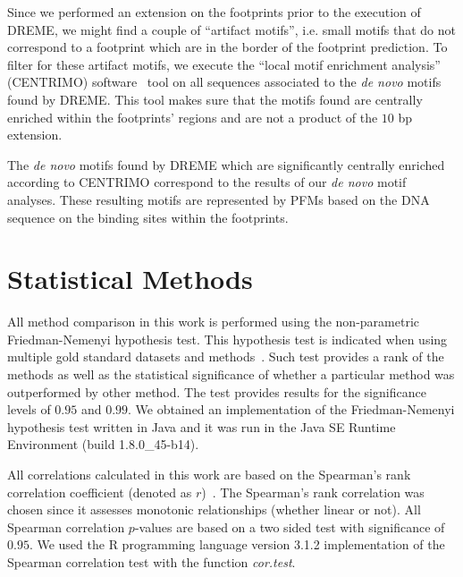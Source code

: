 Since we performed an extension on the footprints prior to the execution of DREME, we might find a couple of ``artifact motifs'', i.e. small motifs that do not correspond to a footprint which are in the border of the footprint prediction. To filter for these artifact motifs, we execute the ``local motif enrichment analysis'' (CENTRIMO) software~\citep{bailey2012} tool on all sequences associated to the \emph{de novo} motifs found by DREME. This tool makes sure that the motifs found are centrally enriched within the footprints' regions and are not a product of the $10$ bp extension.

The \emph{de novo} motifs found by DREME which are significantly centrally enriched according to CENTRIMO correspond to the results of our \emph{de novo} motif analyses. These resulting motifs are represented by PFMs based on the DNA sequence on the binding sites within the footprints.

\section{Statistical Methods}
\label{sec:further.statistical.methods}

All method comparison in this work is performed using the non-parametric Friedman-Nemenyi hypothesis test. This hypothesis test is indicated when using multiple gold standard datasets and methods~\citep{demsar2006}. Such test provides a rank of the methods as well as the statistical significance of whether a particular method was outperformed by other method. The test provides results for the significance levels of $0.95$ and $0.99$. We obtained an implementation of the Friedman-Nemenyi hypothesis test written in Java and it was run in the Java SE Runtime Environment (build 1.8.0\_45-b14).

All correlations calculated in this work are based on the Spearman's rank correlation coefficient (denoted as $r$)~\citep{duda2000}. The Spearman's rank correlation was chosen since it assesses monotonic relationships (whether linear or not). All Spearman correlation $p$-values are based on a two sided test with significance of $0.95$. We used the R programming language version 3.1.2 implementation of the Spearman correlation test with the function \emph{cor.test}.


